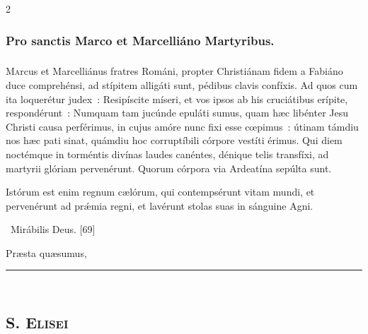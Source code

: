 \documentclass[9pt,twoside]{extarticle}
\begin{document}
\begin{multicols}{2}
\subsubsection*{\center Pro sanctis Marco et Marcelliáno Martyribus.}
\subsubsection*{\center {}}
\lettrine{M}arcus et Marcelliánus fratres Románi, propter Christiánam fidem a Fabiáno duce comprehénsi, ad stípitem alligáti sunt, pédibus clavis confíxis. Ad quos cum ita loquerétur judex~: Resipíscite míseri, et vos ipsos ab his cruciátibus erípite, respondérunt~: Numquam tam jucúnde epuláti sumus, quam hæc libénter Jesu Christi causa perférimus, in cujus amóre nunc fixi esse cœpimus~: útinam támdiu nos hæc pati sinat, quámdiu hoc corruptíbili córpore vestíti érimus. Qui diem noctémque in torméntis divínas laudes canéntes, dénique telis transfíxi, ad martyrii glóriam pervenérunt. Quorum córpora via Ardeatína sepúlta sunt.

\begin{tightlist}{}
\item {} Istórum est enim regnum cælórum, qui contempsérunt vitam mundi, et pervenérunt ad prǽmia regni, et lavérunt stolas suas in sánguine Agni.
\item {}~Mirábilis Deus. [69] 
\item {} Præsta quæsumus, 
\item {}
\end{tightlist}

\begin{center}\textcolor{red}{\rule{\linewidth}{0.5pt}} \end{center}

\subsection*{\center \textsc{\\
S. Elisei}}
\subsubsection*{\center {}}


\end{multicols}
\end{document}
